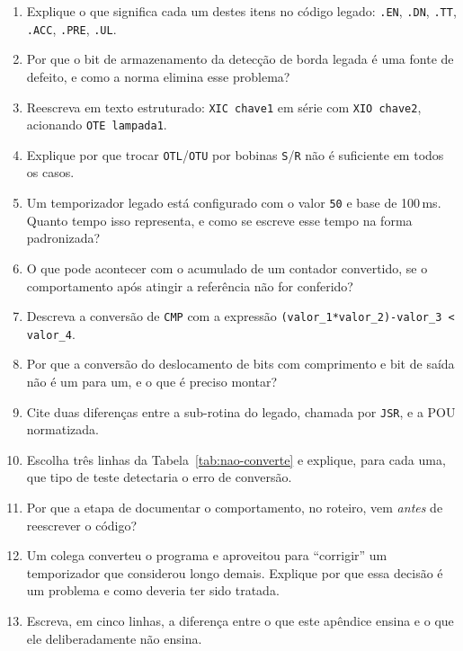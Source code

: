 \begin{exercicios}
\begin{enumerate}[label=\alph*)]
  \item Explique o que significa cada um destes itens no código legado: \texttt{.EN}, \texttt{.DN},
        \texttt{.TT}, \texttt{.ACC}, \texttt{.PRE}, \texttt{.UL}.
  \item Por que o bit de armazenamento da detecção de borda legada é uma fonte de defeito, e como a
        norma elimina esse problema?
  \item Reescreva em texto estruturado: \texttt{XIC chave1} em série com \texttt{XIO chave2},
        acionando \texttt{OTE lampada1}.
  \item Explique por que trocar \texttt{OTL}/\texttt{OTU} por bobinas \texttt{S}/\texttt{R} não é
        suficiente em todos os casos.
  \item Um temporizador legado está configurado com o valor \texttt{50} e base de 100\,ms. Quanto
        tempo isso representa, e como se escreve esse tempo na forma padronizada?
  \item O que pode acontecer com o acumulado de um contador convertido, se o comportamento após
        atingir a referência não for conferido?
  \item Descreva a conversão de \texttt{CMP} com a expressão \texttt{(valor\_1*valor\_2)-valor\_3 <
        valor\_4}.
  \item Por que a conversão do deslocamento de bits com comprimento e bit de saída não é um para um, e
        o que é preciso montar?
  \item Cite duas diferenças entre a sub-rotina do legado, chamada por \texttt{JSR}, e a POU
        normatizada.
  \item Escolha três linhas da Tabela~\ref{tab:nao-converte} e explique, para cada uma, que tipo de
        teste detectaria o erro de conversão.
  \item Por que a etapa de documentar o comportamento, no roteiro, vem \emph{antes} de reescrever o
        código?
  \item Um colega converteu o programa e aproveitou para ``corrigir'' um temporizador que considerou
        longo demais. Explique por que essa decisão é um problema e como deveria ter sido tratada.
  \item Escreva, em cinco linhas, a diferença entre o que este apêndice ensina e o que ele
        deliberadamente não ensina.
\end{enumerate}
\end{exercicios}

